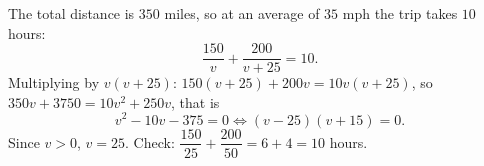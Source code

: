 The total distance is $350$ miles, so at an average of $35$ mph the trip takes $10$ hours:
\[
\dfrac{150}{v}+\dfrac{200}{v+25}=10 .
\]
Multiplying by $v(v+25)$: $150(v+25)+200v=10v(v+25)$, so $350v+3750=10v^2+250v$, that is
\[
v^2-10v-375=0\iff(v-25)(v+15)=0 .
\]
Since $v>0$, $v=\boxed{25}$. Check: $\dfrac{150}{25}+\dfrac{200}{50}=6+4=10$ hours.
